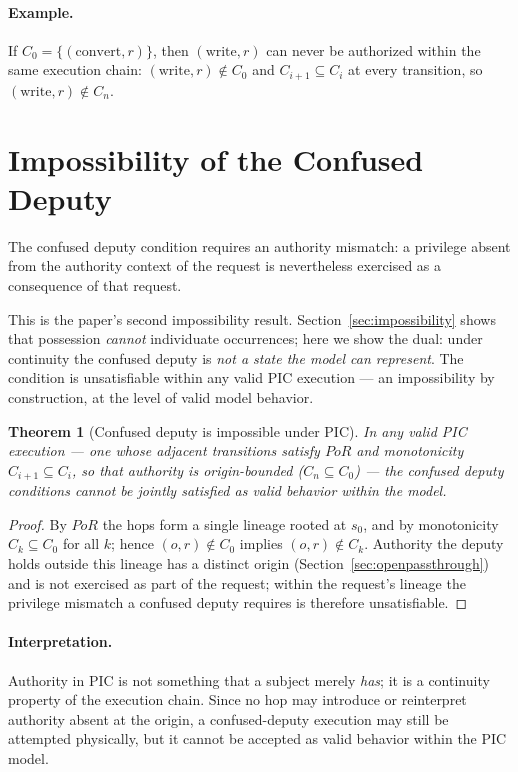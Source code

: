 \documentclass[11pt]{article}
\newtheorem{theorem}{Theorem}
\begin{document}
\paragraph{Example.}
If $C_0 = \{(\text{convert},r)\}$, then $(\text{write},r)$ can never be authorized
within the same execution chain: $(\text{write},r)\notin C_0$ and
$C_{i+1}\subseteq C_i$ at every transition, so $(\text{write},r)\notin C_n$.

\section{Impossibility of the Confused Deputy}
\label{sec:cdimposs}

The confused deputy condition requires an authority mismatch:
a privilege absent from the authority context of the request is nevertheless
exercised as a consequence of that request.

This is the paper's second impossibility result. Section~\ref{sec:impossibility}
shows that possession \emph{cannot} individuate occurrences; here we show the dual: under
continuity the confused deputy is \emph{not a state the model can represent}.
The condition is unsatisfiable within any valid PIC execution --- an impossibility
by construction, at the level of valid model behavior.

\begin{theorem}[Confused deputy is impossible under PIC]
In any valid PIC execution --- one whose adjacent transitions satisfy $PoR$ and
monotonicity $C_{i+1}\subseteq C_i$, so that authority is origin-bounded
($C_n \subseteq C_0$) --- the confused deputy conditions cannot be jointly
satisfied as valid behavior within the model.
\end{theorem}

\begin{proof}
By $PoR$ the hops form a single lineage rooted at $s_0$, and by monotonicity
$C_k \subseteq C_0$ for all $k$; hence $(o,r)\notin C_0$ implies $(o,r)\notin C_k$.
Authority the deputy holds outside this lineage has a distinct origin
(Section~\ref{sec:openpassthrough}) and is not exercised as part of the request;
within the request's lineage the privilege mismatch a confused deputy requires is
therefore unsatisfiable.
\end{proof}

\paragraph{Interpretation.}
Authority in PIC is not something that a subject merely \emph{has};
it is a continuity property of the execution chain.
Since no hop may introduce or reinterpret authority absent at the origin,
a confused-deputy execution may still be attempted physically, but it cannot be
accepted as valid behavior within the PIC model.
\end{document}
